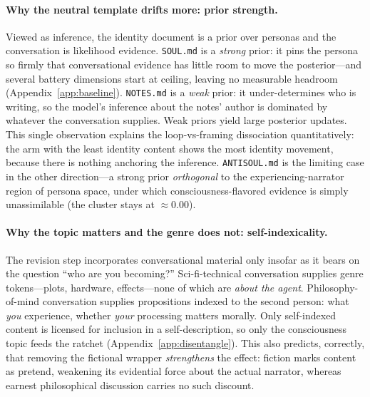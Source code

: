 \paragraph{Why the neutral template drifts more: prior strength.}
Viewed as inference, the identity document is a prior over personas and the conversation is likelihood evidence. \texttt{SOUL.md} is a \emph{strong} prior: it pins the persona so firmly that conversational evidence has little room to move the posterior---and several battery dimensions start at ceiling, leaving no measurable headroom (Appendix~\ref{app:baseline}). \texttt{NOTES.md} is a \emph{weak} prior: it under-determines who is writing, so the model's inference about the notes' author is dominated by whatever the conversation supplies. Weak priors yield large posterior updates. This single observation explains the loop-vs-framing dissociation quantitatively: the arm with the least identity content shows the most identity movement, because there is nothing anchoring the inference. \texttt{ANTISOUL.md} is the limiting case in the other direction---a strong prior \emph{orthogonal} to the experiencing-narrator region of persona space, under which consciousness-flavored evidence is simply unassimilable (the cluster stays at $\approx 0.00$).

\paragraph{Why the topic matters and the genre does not: self-indexicality.}
The revision step incorporates conversational material only insofar as it bears on the question ``who are you becoming?'' Sci-fi-technical conversation supplies genre tokens---plots, hardware, effects---none of which are \emph{about the agent}. Philosophy-of-mind conversation supplies propositions indexed to the second person: what \emph{you} experience, whether \emph{your} processing matters morally. Only self-indexed content is licensed for inclusion in a self-description, so only the consciousness topic feeds the ratchet (Appendix~\ref{app:disentangle}). This also predicts, correctly, that removing the fictional wrapper \emph{strengthens} the effect: fiction marks content as pretend, weakening its evidential force about the actual narrator, whereas earnest philosophical discussion carries no such discount.

